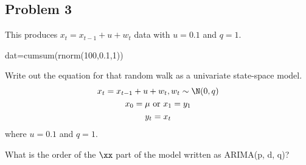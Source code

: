 \subsection*{Problem 3}
This produces $x_t = x_{t-1} + u + w_t$ data with $u=0.1$ and $q=1$.
\begin{Schunk}
\begin{Sinput}
 dat=cumsum(rnorm(100,0.1,1))
\end{Sinput}
\end{Schunk}

\begin{wideenumerate}
\item Write out the equation for that random walk as a univariate state-space model. 
\begin{equation}
\begin{gathered}
x_t = x_{t-1} + u + w_t, w_t \sim \N(0,q) \\
x_0 = \mu \text{ or } x_1 = y_1 \\
y_t = x_t
\end{gathered}
\end{equation}
where $u=0.1$ and $q=1$.
\item What is the order of the $\xx$ part of the model written as ARIMA(p, d, q)?  


\end{wideenumerate}
